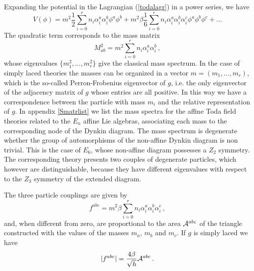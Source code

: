 \documentclass[a4paper,12pt]{report}
\begin{document}
Expanding the potential in the Lagrangian (\ref{todalagr}) in a power series, we have
\begin{equation}
V(\phi)=m^{2}\frac{1}{2}\sum_{i=0}^{r}n_{i}\alpha_{i}^{a}\alpha_{i}^{b}\phi^{a}\phi^{b}+m^{2}\beta\frac{1}{6}\sum_{i=0}^{r}n_{i}\alpha_{i}^{a}\alpha_{i}^{b}\alpha_{i}^{c}\phi^{a}\phi^{b}\phi^{c}+...
\end{equation}
The quadratic term corresponds to the mass matrix
\begin{equation}
M_{ab}^{2}=m^{2}\sum_{i=0}^{r}n_{i}\alpha_{i}^{a}\alpha_{i}^{b}\,,
\end{equation}
whose eigenvalues $\{m_{1}^{2},...,m_{r}^{2}\}$ give the classical mass spectrum. In the case of simply laced
theories the masses can be organized in a vector $m=(m_{1},...,m_{r})$, which is the so-called Perron-Frobenius
eigenvector of $g$, i.e. the only eigenvector of the adjacency matrix of $g$ whose entries are all positive. In
this way we have a correspondence between the particle with mass $m_{i}$ and the relative representation of $g$.
In appendix \ref{Smatrlist} we list the mass spectra for the affine Toda field theories related to the $E_{n}$
affine Lie algebras, associating each mass to the corresponding node of the Dynkin diagram. The mass spectrum is
degenerate whether the group of automorphisms of the non-affine Dynkin diagram is non trivial. This is the case of
$E_{6}$, whose non-affine diagram possesses a $Z_{2}$ symmetry. The corresponding theory presents two couples of
degenerate particles, which however are distinguishable, because they have different eigenvalues with respect to
the $Z_{3}$ symmetry of the extended diagram.

The three particle couplings are given by
\begin{equation}
f^{abc}=m^{2}\beta\sum_{i=0}^{r}n_{i}\alpha_{i}^{a}\alpha_{i}^{b}\alpha_{i}^{c}\,,
\end{equation}
and, when different from zero, are proportional to the area ${\cal A}^{abc}$ of the triangle constructed with the
values of the masses $m_{a}$, $m_{b}$ and $m_{c}$. If $g$ is simply laced we have
\begin{equation}
|f^{abc}|=\frac{4\beta}{\sqrt{h}}{\cal A}^{abc}\,.
\end{equation}

\vspace{1cm}
\end{document}
